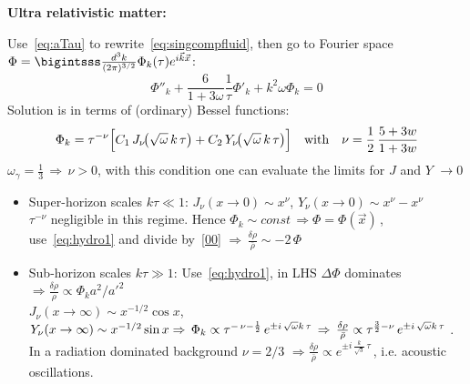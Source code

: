 \begin{mycolorbox}
    \textbf{Ultra relativistic matter:} 
    
    Use~\eqref{eq:aTau} to rewrite~\eqref{eq:singcompfluid}, then go to Fourier space $\Phi = \bigintsss \frac{d^3k}{(2\pi)^{3/2}} \Phi_k(\tau) e^{i\vec{k}\vec{x}}$:
    \begin{equation}
        \Phi''_k + \frac{6}{1+3\omega}\frac{1}{\tau} \Phi'_k + k^2 \omega \Phi_k = 0
    \end{equation}
    Solution is in terms of (ordinary) Bessel functions:
    \begin{equation}
        \Phi_{k} = \tau^{-\nu}
               \Bigl[
                  C_{1}\,J_{\nu}\!\bigl(\sqrt{\omega}\,k\,\tau\bigr)
                + C_{2}\,Y_{\nu}\!\bigl(\sqrt{\omega}\,k\,\tau\bigr)
               \Bigr] \quad  \text{with}\quad \nu = \frac{1}{2}\,\frac{5 + 3w}{1 + 3w}
    \end{equation}
    $\omega_\gamma = \frac{1}{3} \,\Rightarrow\, \nu>0$, with this condition one can evaluate the limits for $J$ and $Y$ $\rightarrow 0$
    \begin{itemize}
        \item Super-horizon scales $k \tau \ll1$: $J_{\nu}(x\rightarrow0)\sim x^\nu$, $Y_{\nu}(x\rightarrow0)\sim x^{\nu}-x^{\nu}$ \\ $\tau^{-\nu}$ negligible in this regime. Hence $\Phi_k \sim const \,\Rightarrow \Phi = \Phi(\vec{x})\,$, use~\eqref{eq:hydro1} and divide by~\eqref{00} $\Rightarrow \, \frac{\delta \rho}{\bar{\rho}} \sim -2\,\Phi$
        \item Sub-horizon scales  $k \tau \gg1$:  Use~\eqref{eq:hydro1}, in LHS $\Delta \Phi$ dominates $\Rightarrow \frac{\delta\rho}{\rho} \propto \Phi_k a^2/a'^2$\\
        $J_{\nu}(x\rightarrow \infty)\sim x^{-1/2}\cos{x}$, $Y_{\nu}(x\rightarrow \infty)\sim x^{-1/2}\sin{x} \\\Rightarrow\,\Phi_{k} \propto \tau^{-\,\nu-\frac{1}{2}}\,
        e^{\pm i\,\sqrt{\omega} k\,\tau} \,\Rightarrow\, \frac{\delta \rho}{\bar{\rho}} \propto \tau^{\frac{3}{2}-\nu}\, e^{\pm i\,\sqrt{\omega} k\,\tau}$ . In a radiation dominated background $\nu = 2/3$ $\Rightarrow \frac{\delta\rho}{\bar{\rho}} \propto e^{\pm i\,\frac{k}{\sqrt{3}}\,\tau} \,$, i.e. acoustic oscillations.
    \end{itemize}
\end{mycolorbox}

